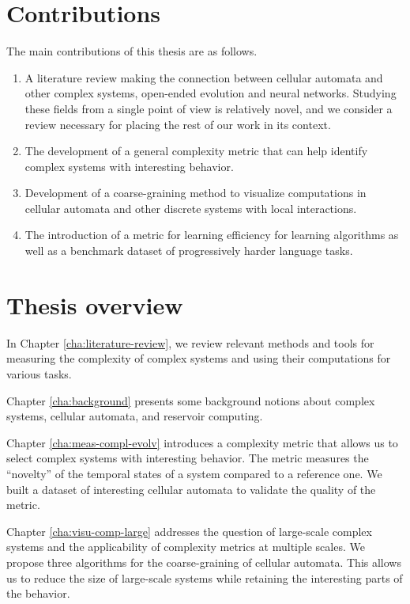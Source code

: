 \section{Contributions}

The main contributions of this thesis are as follows.
\begin{enumerate}
  \item A literature review making the connection between cellular automata and
        other complex systems, open-ended evolution and neural networks.
        Studying these fields from a single point of view is relatively novel,
        and we consider a review necessary for placing the rest of our work in
        its context.

  \item The development of a general complexity metric that can help identify
        complex systems with interesting behavior.

  \item Development of a coarse-graining method to visualize computations
        in cellular automata and other discrete systems with local interactions.

  \item The introduction of a metric for learning efficiency for learning
        algorithms as well as a benchmark dataset of progressively harder
        language tasks.
\end{enumerate}

\section{Thesis overview}

In Chapter \ref{cha:literature-review}, we review relevant methods and tools for
measuring the complexity of complex systems and using their computations for
various tasks.

Chapter \ref{cha:background} presents some background notions about complex
systems, cellular automata, and reservoir computing.

Chapter \ref{cha:meas-compl-evolv} introduces a complexity metric that allows us 
to select complex systems with interesting behavior. The metric measures the
``novelty'' of the temporal states of a system compared to a reference one. We
built a dataset of interesting cellular automata to validate the quality of the
metric.

Chapter \ref{cha:visu-comp-large} addresses the question of large-scale complex
systems and the applicability of complexity metrics at multiple scales. We
propose three algorithms for the coarse-graining of cellular automata. This allows
us to reduce the size of large-scale systems while retaining the interesting parts
of the behavior.

